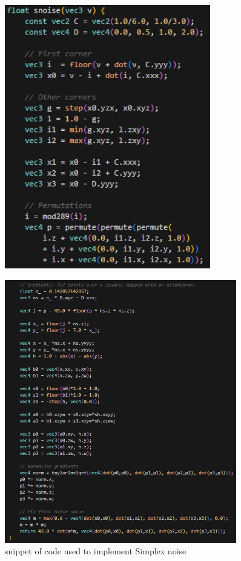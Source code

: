 \documentclass[12pt]{article}
\begin{document}
\begin{enumerate}
    \begin{figure}[H]
        \label{img:snoiseFunction}
        \centering
        \includegraphics[width=0.8\textwidth]{Images/cube2code.png}
    \end{figure}

    \begin{figure}[H]
        \centering
        \includegraphics[width=0.9\textwidth]{Images/cube2code2.png}
        \caption{snippet of code used to implement Simplex noise}
    \end{figure}


\end{enumerate}
\end{document}

